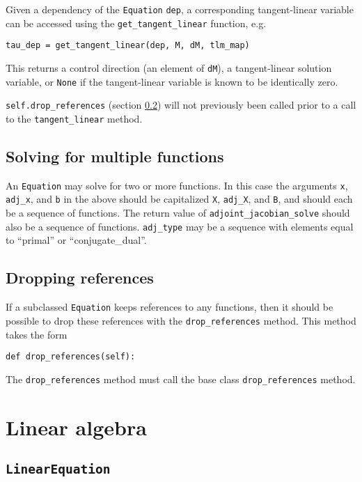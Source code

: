 \documentclass[11pt]{article}
\begin{document}
Given a dependency of the \texttt{Equation} \texttt{dep}, a corresponding
tangent-linear variable can be accessed using the \texttt{get\_tangent\_linear}
function, e.g.
\begin{lstlisting}
tau_dep = get_tangent_linear(dep, M, dM, tlm_map)
\end{lstlisting}
This returns a control direction (an element of \texttt{dM}), a tangent-linear
solution variable, or \texttt{None} if the tangent-linear variable is known to
be identically zero.

\texttt{self.drop\_references} (section \ref{sect:drop_references}) will not
previously been called prior to a call to the \texttt{tangent\_linear} method.

\subsection{Solving for multiple functions}

An \texttt{Equation} may solve for two or more functions. In this case the
arguments \texttt{x}, \texttt{adj\_x}, and \texttt{b} in the above should be
capitalized \texttt{X}, \texttt{adj\_X}, and \texttt{B}, and should each be a
sequence of functions. The return value of \texttt{adjoint\_jacobian\_solve}
should also be a sequence of functions. \texttt{adj\_type} may be a sequence
with elements equal to ``primal'' or ``conjugate\_dual''.

\subsection{Dropping references}\label{sect:drop_references}

If a subclassed \texttt{Equation} keeps references to any functions, then it
should be possible to drop these references with the \texttt{drop\_references}
method. This method takes the form
\begin{lstlisting}
def drop_references(self):
\end{lstlisting}
The \texttt{drop\_references} method must call the base class
\texttt{drop\_references} method.

\section{Linear algebra}

\subsection{\texttt{LinearEquation}}
\end{document}
